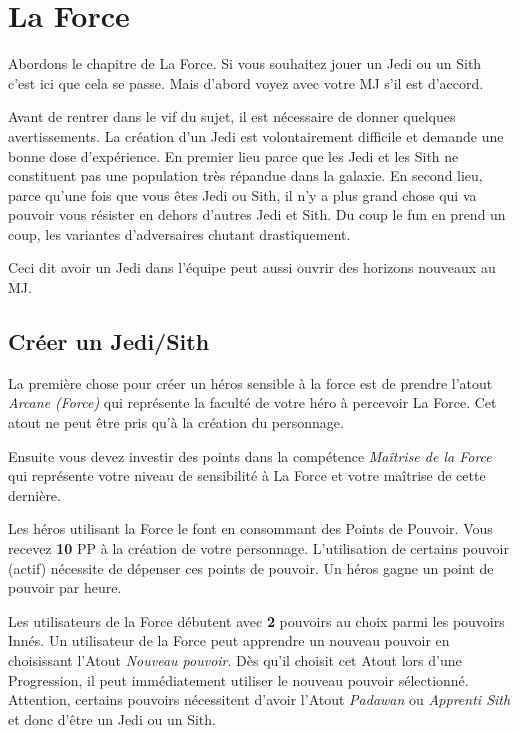 \section{La Force}
\label{sec:force}

Abordons le chapitre de La Force. Si vous souhaitez jouer un Jedi ou un Sith c’est ici que cela se passe. Mais d’abord voyez avec votre MJ s’il est d’accord.

Avant de rentrer dans le vif du sujet, il est nécessaire de donner quelques avertissements. La création d’un Jedi est volontairement difficile et demande une bonne dose d’expérience. En premier lieu parce que les Jedi et les Sith ne constituent pas une population très répandue dans la galaxie. En second lieu, parce qu’une fois que vous êtes Jedi ou Sith, il n’y a plus grand chose qui va pouvoir vous résister en dehors d’autres Jedi et Sith. Du coup le fun en prend un coup, les variantes d’adversaires chutant drastiquement.

Ceci dit avoir un Jedi dans l’équipe peut aussi ouvrir des horizons nouveaux au MJ.

\subsection{Créer un Jedi/Sith}
La première chose pour créer un héros sensible à la force est de prendre l’atout \emph{Arcane (Force)} qui représente la faculté de votre héro à percevoir La Force. Cet atout ne peut être pris qu’à la création du personnage.

Ensuite vous devez investir des points dans la compétence \emph{Maîtrise de la Force} qui représente votre niveau de sensibilité à La Force et votre maîtrise de cette dernière.

Les héros utilisant la Force le font en consommant des Points de Pouvoir. Vous recevez \textbf{10} PP à la création de votre personnage. L’utilisation de certains pouvoir (actif) nécessite de dépenser ces points de pouvoir. Un héros gagne un point de pouvoir par heure.

Les utilisateurs de la Force débutent avec \textbf{2} pouvoirs au choix parmi les pouvoirs Innés. Un utilisateur de la Force peut apprendre un nouveau pouvoir en choisissant l’Atout \emph{Nouveau pouvoir}. Dès qu’il choisit cet Atout lors d’une Progression, il peut immédiatement utiliser le nouveau pouvoir sélectionné. Attention, certains pouvoirs nécessitent d’avoir l’Atout \emph{Padawan} ou \emph{Apprenti Sith} et donc d’être un Jedi ou un Sith.

